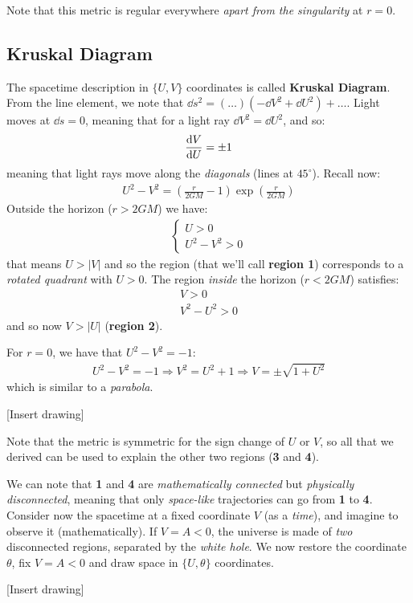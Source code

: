 \documentclass[../template.tex]{subfiles}
\begin{document}
Note that this metric is regular everywhere \textit{apart from the singularity} at $r = 0$. 

\subsection{Kruskal Diagram}
The spacetime description in $\{U,V\}$ coordinates is called \textbf{Kruskal Diagram}. From the line element, we note that $\dd{s}^2 = (\dots) (-\dd{V^2} + \dd{U}^2) + \dots$. Light moves at $\dd{s} = 0$, meaning that for a light ray $\dd{V}^2 = \dd{U^2}$, and so:
\begin{align*}
    \dv{V}{U} = \pm 1
\end{align*}
meaning that light rays move along the \textit{diagonals} (lines at $45^\circ$). Recall now:
\begin{align*}
    U^2 - V^2 = \left(\frac{r}{2GM} - 1 \right)\exp\left(\frac{r}{2GM} \right)
\end{align*} 
Outside the horizon ($r > 2GM$) we have:
\begin{align*}
    \begin{cases}
        U > 0 \\
        U^2 - V^2 > 0
    \end{cases}
\end{align*}
that means $U > |V|$ and so the region (that we'll call \textbf{region 1}) corresponds to a \textit{rotated quadrant} with $U > 0$.   
The region \textit{inside} the horizon ($r < 2GM$) satisfies:
\begin{align*}
    V > 0\\
    V^2 - U^2 > 0
\end{align*} 
and so now $V > |U|$ (\textbf{region 2}). 

For $r = 0$, we have that $U^2-V^2 = -1$:
\begin{align*}
    U^2 - V^2 = -1 \Rightarrow V^2 = U^2 + 1 \Rightarrow V = \pm \sqrt{1+ U^2}
\end{align*}  
which is similar to a \textit{parabola}.   

[Insert drawing]

Note that the metric is symmetric for the sign change of $U$ or $V$, so all that we derived can be used to explain the other two regions (\textbf{3} and \textbf{4}).

We can note that \textbf{1} and \textbf{4} are \textit{mathematically connected} but \textit{physically disconnected}, meaning that only \textit{space-like} trajectories can go from \textbf{1} to \textbf{4}. \\

Consider now the spacetime at a fixed coordinate $V$ (as a \textit{time}), and imagine to observe it (mathematically). If $V = A < 0$, the universe is made of \textit{two} disconnected regions, separated by the \textit{white hole}. We now restore the coordinate $\theta$, fix $V = A < 0$ and draw space in $\{U,\theta\}$ coordinates.

[Insert drawing]
\end{document}

